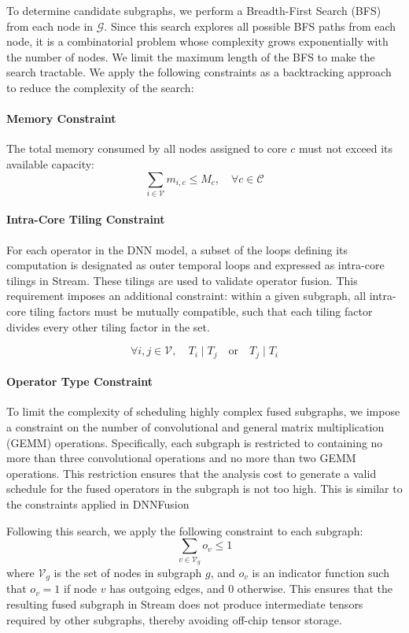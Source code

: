 \documentclass[lettersize,journal]{IEEEtran}
\begin{document}
To determine candidate subgraphs, we perform a Breadth-First Search (BFS) from each node in $\mathcal{G}$. Since this search explores all possible BFS paths from each node, it is a combinatorial problem whose complexity grows exponentially with the number of nodes. We limit the maximum length of the BFS to make the search tractable. We apply the following constraints as a backtracking approach to reduce the complexity of the search: 
\paragraph*{Memory Constraint}
The total memory consumed by all nodes assigned to core $c$ must not exceed its available capacity:
\[
\sum_{i \in \mathcal{V}} m_{i,c} \leq M_c, \quad \forall c \in \mathcal{C}
\]

\paragraph*{Intra-Core Tiling Constraint}
For each operator in the DNN model, a subset of the loops defining its computation is designated as outer temporal loops and expressed as intra-core tilings in Stream. These tilings are used to validate operator fusion. This requirement imposes an additional constraint: within a given subgraph, all intra-core tiling factors must be mutually compatible, such that each tiling factor divides every other tiling factor in the set.


\[
\forall i, j \in \mathcal{V}, \quad T_i \mid T_j \quad \text{or} \quad T_j \mid T_i
\]

\paragraph*{Operator Type Constraint}
To limit the complexity of scheduling highly complex fused subgraphs, we impose a constraint on the number of convolutional and general matrix multiplication (GEMM) operations. Specifically, each subgraph is restricted to containing no more than three convolutional operations and no more than two GEMM operations. This restriction ensures that the analysis cost to generate a valid schedule for the fused operators in the subgraph is not too high. This is similar to the constraints applied in DNNFusion~\cite{dnnfusion2021}

Following this search, we apply the following constraint to each subgraph: 
\[
\sum_{v \in \mathcal{V}_g} o_v \leq 1
\]
where $\mathcal{V}_g$ is the set of nodes in subgraph $g$, and $o_v$ is an indicator function such that $o_v = 1$ if node $v$ has outgoing edges, and $0$ otherwise. This ensures that the resulting fused subgraph in Stream does not produce intermediate tensors required by other subgraphs, thereby avoiding off-chip tensor storage. 
\end{document}

